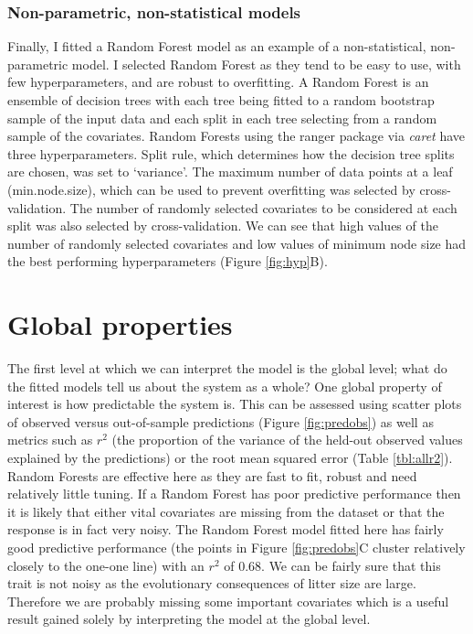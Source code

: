 \documentclass[12pt]{article}
\begin{document}
\subsubsection{Non-parametric, non-statistical models}\label{non-parametric-non-statistical-models}

Finally, I fitted a Random Forest model \citep{breiman2001random, wright2015ranger} as an example of a non-statistical, non-parametric model.
I selected Random Forest as they tend to be easy to use, with few hyperparameters, and are robust to overfitting.
A Random Forest is an ensemble of decision trees with each tree being fitted to a random bootstrap sample of the input data and each split in each tree selecting from a random sample of the covariates.
Random Forests using the ranger  package \citep{wright2015ranger} via \emph{caret} have three hyperparameters.
Split rule, which determines how the decision tree splits are chosen, was set to `variance'.
The maximum number of data points at a leaf (min.node.size), which can be used to prevent overfitting was selected by cross-validation.
The number of randomly selected covariates to be considered at each split  was also selected by cross-validation.
We can see that high values of the number of randomly selected covariates and low values of minimum node size had the best performing hyperparameters (Figure \ref{fig:hyp}B).


\section{Global properties}\label{global-properties}

The first level at which we can interpret the model is the global level; what do the fitted models tell us about the system as a whole?
One global property of interest is how predictable the system is.
This can be assessed using scatter plots of observed versus out-of-sample predictions (Figure \ref{fig:predobs}) as well as metrics such as  \(r^2\) (the proportion of the variance of the held-out observed values explained by the predictions) or the root mean squared error (Table \ref{tbl:allr2}).
Random Forests are effective here as they are fast to fit, robust and need relatively little tuning.
If a Random Forest has poor predictive performance then it is likely that either vital covariates are missing from the dataset or that the response is in fact very noisy.
The Random Forest model fitted here has fairly good predictive performance (the points in Figure \ref{fig:predobs}C cluster relatively closely to the one-one line) with an \(r^2\) of 0.68.
We can be fairly sure that this trait is not noisy as the evolutionary consequences of litter size are large.
Therefore we are probably missing some important covariates which is a useful result gained solely by interpreting the model at the global level.
\end{document}
